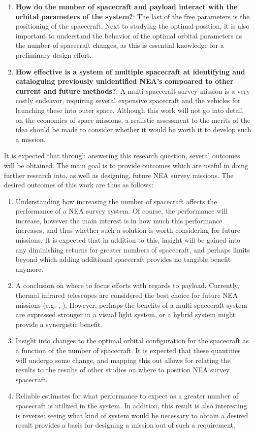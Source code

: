\begin{enumerate}
 \item \textbf{How do the number of spacecraft and payload interact with the orbital parameters of the system?}: The last of the free parameters is the positioning of the spacecraft. Next to studying the optimal position, it is also important to understand the behavior of the optimal orbital parameters as the number of spacecraft changes, as this is essential knowledge for a preliminary design effort.
 \item \textbf{How effective is a system of multiple spacecraft at identifying and cataloguing previously unidentified NEA's compoared to other current and future methods?}: A multi-spacecraft survey mission is a very costly endeavor, requiring several expensive spacecraft and the vehicles for launching these into outer space. Although this work will not go into detail on the economics of space missions, a realistic assessment to the merits of the idea should be made to consider whether it would be worth it to develop such a mission. 
\end{enumerate}

It is expected that through answering this research question, several outcomes will be obtained. The main goal is to provide outcomes which are useful in doing further research into, as well as designing, future NEA survey missions. The desired outcomes of this work are thus as follows:
\begin{enumerate}
 \item Understanding how increasing the number of spacecraft affects the performance of a NEA survey system. Of course, the performance will increase, however the main interest is in how much this performance increases, and thus whether such a solution is worth considering for future missions. It is expected that in addition to this, insight will be gained into any diminishing returns for greater numbers of spacecraft, and perhaps limits beyond which adding additional spacecraft provides no tangible benefit anymore.
 \item A conclusion on where to focus efforts with regards to payload. Currently, thermal infrared telescopes are considered the best choice for future NEA missions (e.g. \cite{2017NEOSDT}, \cite{ThesisOlga}). However, perhaps the benefits of a multi-spacecraft system are expressed stronger in a visual light system, or a hybrid system might provide a synergistic benefit.
 \item Insight into changes to the optimal orbital configuration for the spacecraft as a function of the number of spacecraft. It is expected that these quantities will undergo some change, and mapping this out allows for relating the results to the results of other studies on where to position NEA survey spacecraft.
 \item Reliable estimates for what performance to expect as a greater number of spacecraft is utilized in the system. In addition, this result is also interesting is reverse: seeing what kind of system would be necessary to obtain a desired result provides a basis for designing a mission out of such a requirement.
\end{enumerate}

